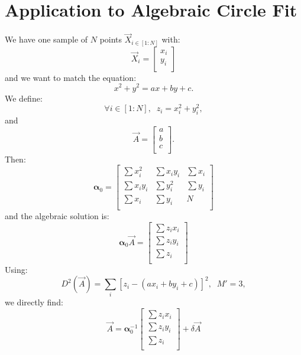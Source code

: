 \documentclass[aps,12pt]{revtex4}
\begin{document}
\section{Application to Algebraic Circle Fit}
We have one sample of $N$ points $\vec{X}_{i\in[1:N]}$ with:
\begin{equation}
	\vec{X}_i = \begin{bmatrix}x_i\\y_i\\\end{bmatrix}
\end{equation}
and we want to match the equation:
\begin{equation}
	x^2+y^2=ax+by+c.
\end{equation}
We define:
\begin{equation}
	\forall i \in [1:N], \;\; z_i = x_i^2+y_i^2,
\end{equation}
and
\begin{equation}
	\vec{A} = \begin{bmatrix} a\\b\\c\\ \end{bmatrix}.
\end{equation}
Then:
\begin{equation}
	\bm{\alpha}_0 = 
	\begin{bmatrix}
	\sum x_i^2 & \sum x_iy_i & \sum x_i\\
	\sum x_iy_i & \sum y_i^2 & \sum y_i\\
	\sum x_i & \sum y_i & N \\
	\end{bmatrix}
\end{equation}
and the algebraic solution is:
\begin{equation}
\bm{\alpha}_0 \vec{A} = \begin{bmatrix}
	\sum z_i x_i\\
	\sum z_i y_i\\
	\sum z_i\\
\end{bmatrix}
\end{equation}
Using:
\begin{equation}
	D^2(\vec{A}) = \sum_i \left[z_i - (ax_i+by_i+c)\right]^2, \;\; M'=3,
\end{equation}
we directly find:
\begin{equation}
	\vec{A} = \bm{\alpha}_0^{-1} \begin{bmatrix}
	\sum z_i x_i\\
	\sum z_i y_i\\
	\sum z_i\\
\end{bmatrix}
+ \delta \vec{A}
\end{equation}
\end{document}
